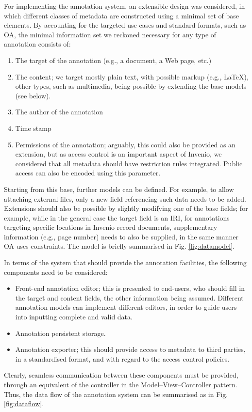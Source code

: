 
For implementing the annotation system, an extensible design was considered, in
which different classes of metadata are constructed using a minimal set of base
elements.  By accounting for the targeted use cases and standard formats, such
as OA, the minimal information set we reckoned necessary for any type of
annotation consists of:
\begin{enumerate}
  \item The target of the annotation (e.g., a document, a Web page, etc.)
  \item The content; we target mostly plain text, with possible markup
        (e.g., \LaTeX), other types, such as multimedia, being possible by
        extending the base models (see below).
  \item The author of the annotation
  \item Time stamp
  \item Permissions of the annotation; arguably, this could also be provided as
        an extension, but as access control is an important aspect of Invenio,
        we considered that all metadata should have restriction rules
        integrated. Public access can also be encoded using this parameter.
\end{enumerate}

Starting from this base, further models can be defined. For example, to allow
attaching external files, only a new field referencing such data needs to be
added. Extensions should also be possible by slightly modifying one of the base
fields; for example, while in the general case the target field is an IRI, for
annotations targeting specific locations in Invenio record documents,
supplementary information (e.g., page number) needs to also be supplied, in the
same manner OA uses constraints. The model is briefly summarised in Fig.
\ref{fig:datamodel}.

\newpage

In terms of the system that should provide the annotation facilities, the
following components need to be considered:
\begin{itemize}
  \item Front-end annotation editor; this is presented to end-users,
        who should fill in the target and content fields, the other information
        being assumed. Different annotation models can implement different
        editors, in order to guide users into inputting complete and valid data.
  \item Annotation persistent storage.
  \item Annotation exporter; this should provide access to metadata to third
        parties, in a standardised format, and with regard to the access control
        policies.
\end{itemize}
Clearly, seamless communication between these components must be provided,
through an equivalent of the controller in the Model--View--Controller pattern.
Thus, the data flow of the annotation system can be summarised as in Fig.
\ref{fig:dataflow}.

